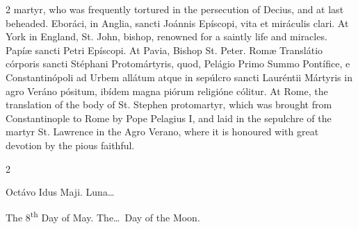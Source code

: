 \begin{paracol}{2}
 martyr, who was frequently tortured in the persecution of Decius, and at 
 last beheaded.
\switchcolumn*
{}
Eboráci, in Anglia, 
 sancti Joánnis Epíscopi, vita et miráculis clari.
\switchcolumn
{}
At York in England, St. John, 
 bishop, renowned for a saintly life and miracles.
\switchcolumn*
{}
Papíæ sancti Petri 
 Epíscopi.
\switchcolumn
{}
At Pavia, Bishop St. Peter.
\switchcolumn*
{}
Romæ Translátio 
 córporis sancti Stéphani Protomártyris, quod, Pelágio Primo Summo Pontífice, 
 e Constantinópoli ad Urbem allátum atque in sepúlcro sancti Lauréntii 
 Mártyris in agro Veráno pósitum, ibídem magna piórum religióne cólitur.
\switchcolumn
{}
At Rome, the translation of the 
 body of St. Stephen protomartyr, which was brought from Constantinople to 
 Rome by Pope Pelagius I, and laid in the sepulchre of the martyr St. Lawrence in the Agro 
 Verano, where it is honoured with great devotion by the pious faithful.
\switchcolumn*
{}
\end{paracol}


\begin{paracol}{2}
\begin{center}{\color{gregoriocolor} Octávo Idus Maji. 
 Luna\dots\ }\end{center}
\switchcolumn
{}
\begin{center}{\color{gregoriocolor} The 
 8\textsuperscript{th} Day of May. The\dots\ Day of the Moon.}\end{center}
\end{paracol}

